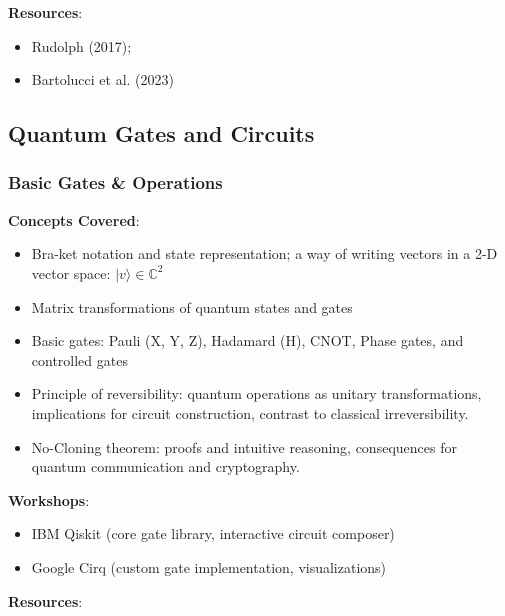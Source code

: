 \textbf{Resources}:

\begin{itemize}
	\item Rudolph (2017);

	\item Bartolucci et al. (2023)
\end{itemize}

	
\subsection{Quantum Gates and Circuits}

	
\subsubsection{Basic Gates \& Operations}

\textbf{Concepts Covered}:

\begin{itemize}
	\item Bra-ket notation and state representation; a way of writing vectors in a 2-D vector space: $|v \rangle \in \mathbb{C}^2$
	\item Matrix transformations of quantum states and gates
	\item Basic gates: Pauli (X, Y, Z), Hadamard (H), CNOT, Phase gates, and controlled gates
	\item Principle of reversibility: quantum operations as unitary transformations, implications for circuit construction, contrast to classical irreversibility.
	\item No-Cloning theorem: proofs and intuitive reasoning, consequences for quantum communication and cryptography.
\end{itemize}
	
\textbf{Workshops}:

\begin{itemize}	
	\item IBM Qiskit (core gate library, interactive circuit composer)
	\item Google Cirq (custom gate implementation, visualizations)
\end{itemize}

\textbf{Resources}:

